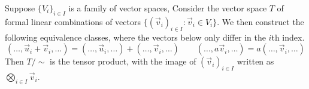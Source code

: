\begin{theorem}\label{thm:tensor-exists}
    Suppose \({\{V_i\}}_{i \in I}\) is a family of vector spaces,
    Consider the vector space \(T\) of formal linear combinations of vectors
    \({\{{(\vec{v}_i)}_{i \in I} : \vec{v}_i \in V_i\}}\).
    We then construct the following equivalence classes,
    where the vectors below only differ in the \(i\)th index.
    \begin{equation*}
        (\hdots,\vec{u}_i+\vec{v}_i,\hdots) = (\hdots,\vec{u}_i,\hdots) + (\hdots,\vec{v}_i,\hdots) \qquad
        (\hdots,a\vec{v}_i,\hdots) = a(\hdots,\vec{v}_i,\hdots)
    \end{equation*}
    Then \(T/{\sim}\) is the tensor product,
    with the image of \({(\vec{v}_i)}_{i \in I}\) written as \(\bigotimes_{i \in I} \vec{v}_i\).
\end{theorem}
